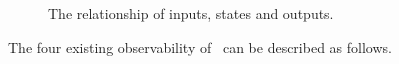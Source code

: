 \begin{figure}[!t]
      \centering
      
      \caption{The relationship of inputs, states and outputs.}
      \label{fig:10}
  \end{figure}

The four existing observability of \BCNs\ can be described as follows. 
